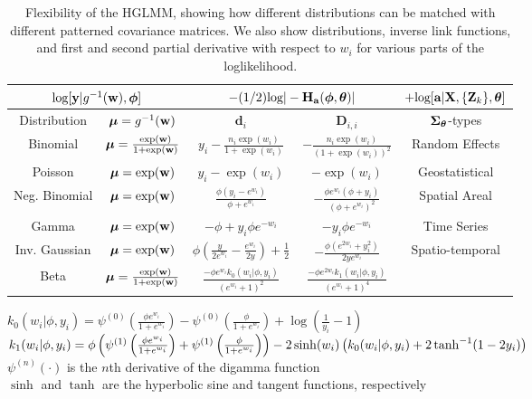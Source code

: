 \documentclass[12pt, titlepage]{article}
\begin{document}
\begin{table}[H] 
	\caption{Flexibility of the HGLMM, showing how different distributions can be matched with different patterned covariance matrices. We also show distributions, inverse link functions, and first and second partial derivative with respect to $w_{i}$ for various parts of the loglikelihood.  \label{tab:dDlinkDist}}
\begin{center}
\begin{tabular}{|cccc||c|}
\hline
\hline
\multicolumn{2}{|c}{$\textrm{log}[\mathbf{y}|g^{-1}(\mathbf{w}),\boldsymbol{\phi}]$} & \multicolumn{2}{c||}{$-(1/2)\textrm{log}|-\mathbf{H}_{\mathbf{a}}(\boldsymbol{\phi},\boldsymbol{\theta})|$} & $+\textrm{log}[\mathbf{a}|\mathbf{X},\{\mathbf{Z}_{k}\},\boldsymbol{\theta}]$ \\
\hline
Distribution & $\boldsymbol{\mu} = g^{-1}(\mathbf{w})$ & $\mathbf{d}_{i}$ & $\mathbf{D}_{i,i}$ & $\mbox{\boldmath $\Sigma$}_{\boldsymbol{\theta}}$-types\\
\hline
Binomial & $\boldsymbol{\mu} =\frac{\exp(\mathbf{w})}{1+\exp(\mathbf{w})}$ & $y_{i} - \frac{n_{i}\exp(w_{i})}{1+\exp(w_{i})}$ & $- \frac{n_{i}\exp(w_{i})}{(1+\exp(w_{i}))^{2}}$ & Random Effects \\ 
Poisson & $\boldsymbol{\mu} = \exp(\mathbf{w})$ & $y_{i} - \exp(w_{i})$ & $- \exp(w_{i})$ & Geostatistical \\ 
Neg. Binomial & $\boldsymbol{\mu} = \exp(\mathbf{w})$ &  $
\frac{\phi(y_{i} - e^{w_{i}})}{\phi + e^{w_{i}}}$ & $-\frac{\phi e^{w_{i}}(\phi + y_{i})}{(\phi + e^{w_{i}})^{2}}$ & Spatial Areal \\ 
Gamma & $\boldsymbol{\mu} = \exp(\mathbf{w})$ & $ -\phi + y_i \phi e^{-w_i}$ & $- y_i \phi e^{-w_i}$ & Time Series \\
Inv. Gaussian & $\boldsymbol{\mu} = \exp(\mathbf{w})$ & $\phi\left(\frac{y}{2e^{w_{i}}} - \frac{ e^{w_{i}}}{2y}\right) + \frac{1}{2}$ & $-\frac{\phi(e^{2w_{i}} + y_{i}^{2})}{2 y e^{w_{i}} }$ & Spatio-temporal\\
Beta & $\boldsymbol{\mu} =\frac{\exp(\mathbf{w})}{1+\exp(\mathbf{w})}$ & $\frac{-\phi e^{w_{i}}k_{0}(w_{i}|\phi,y_{i})}{(e^{w_{i}} + 1)^{2}}$ & $\frac{-\phi e^{2w_{i}}k_{1}(w_{i}|\phi,y_{i})}{(e^{w_{i}} + 1)^{4}}$ & {}\\
\hline
\hline
\end{tabular}
\end{center}
\begin{singlespace}
$k_{0}(w_{i}|\phi,y_{i}) = \psi^{(0)}\left(\frac{\phi e^{w_{i}}}{1 + e^{w_{i}}}\right) - \psi^{(0)}\left(\frac{\phi }{1 + e^{w_{i}}}\right)  + \log\left(\frac{1}{y_{i}} - 1\right)$ \\
$k_{1}(w_{i}|\phi,y_{i}) = \phi\left(\psi^{(1)}\left(\frac{\phi e^{w_{i}}}{1 + e^{w_{i}}}\right) + \psi^{(1)}\left(\frac{\phi }{1 + e^{w_{i}}}\right)\right) - 2\sinh(w_{i})\left(k_{0}(w_{i}|\phi,y_{i}) + 2\tanh^{-1}(1 - 2y_{i})\right)$ \\
$\psi^{(n)}(\cdot)$ is the $n$th derivative of the digamma function \\
$\sinh$ and $\tanh$ are the hyperbolic sine and tangent functions, respectively
\end{singlespace}
\end{table}
%
%
\end{document}
